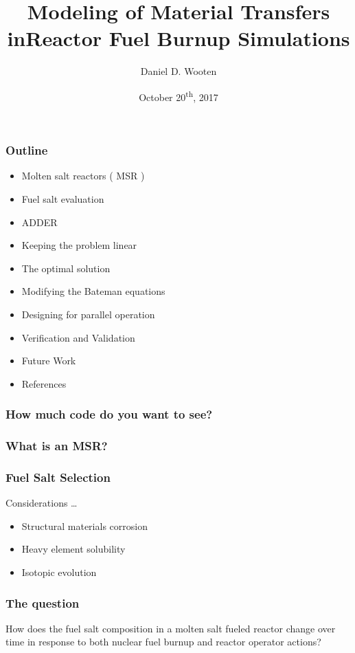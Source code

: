 \documentclass{beamer}
\title[Modeling of Material Transfers in MSRs]{Modeling of Material Transfers inReactor Fuel Burnup Simulations}
\author{Daniel D. Wooten}
\institute{UC Berkeley}
\date{October 20\textsuperscript{th}, 2017}
\begin{document}
\frame{\titlepage}

\begin{frame}

\frametitle{Outline}

    \begin{itemize}
        \item Molten salt reactors ( MSR ) 
        \item Fuel salt evaluation 
        \item ADDER
        \item Keeping the problem linear
        \item The optimal solution
        \item Modifying the Bateman equations
        \item Designing for parallel operation
        \item Verification and Validation
        \item Future Work
        \item References
    \end{itemize}

\end{frame}

\begin{frame}
\frametitle{How much code do you want to see?}

\end{frame}

\begin{frame}
\frametitle{What is an MSR?}

\end{frame}

\begin{frame}
\frametitle{Fuel Salt Selection}

Considerations \ldots

    \begin{itemize}
        \item Structural materials corrosion 
        \item Heavy element solubility
        \item Isotopic evolution
    \end{itemize}

\end{frame}

\begin{frame}
\frametitle{The question}

How does the fuel salt composition in a molten salt fueled reactor change over
time in response to both nuclear fuel burnup and reactor operator actions?

\end{frame}
\end{document}
